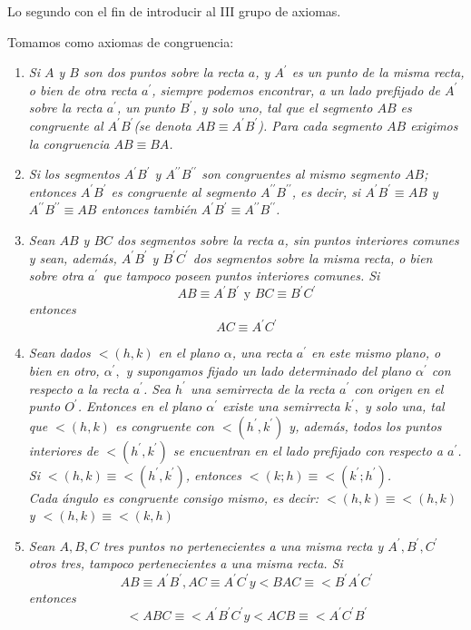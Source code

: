 \documentclass[oneside,spanish]{amsart}
\numberwithin{equation}{section}
\numberwithin{figure}{section}
\theoremstyle{definition}
\begin{document}
Lo segundo con el fin de introducir al III grupo de axiomas.

Tomamos como axiomas de congruencia:
\begin{enumerate}[label=Ax III.\arabic{enumi}]
	\item \emph{Si $A$ y $B$ son dos puntos sobre la recta $a$, y $A^{\prime}$ es un punto de la misma recta, o bien de otra recta $a^{\prime}$, siempre podemos encontrar, a un lado prefijado de $A^{\prime}$ sobre la recta $a^{\prime}$, un punto $B^{\prime}$, y solo uno, tal que el segmento $AB$ es congruente al $A^{\prime}B^{\prime}$(se denota $AB\equiv A^{\prime}B^{\prime}$). Para cada segmento $AB$ exigimos la congruencia $AB\equiv BA$.}
	\item \emph{Si los segmentos $A^{\prime}B^{\prime}$ y $A^{\prime\prime}B^{\prime\prime}$ son congruentes al mismo segmento $AB$; entonces $A^{\prime}B^{\prime}$ es congruente al segmento $A^{\prime\prime}B^{\prime\prime}$, es decir, si $A^{\prime}B^{\prime}\equiv AB$ y $A^{\prime\prime}B^{\prime\prime}\equiv AB$ entonces también $A^{\prime}B^{\prime}\equiv A^{\prime\prime}B^{\prime\prime}$.}
	\item \emph{Sean $AB$ y $BC$ dos segmentos sobre la recta $a$, sin puntos interiores comunes y sean, además, $A^{\prime}B^{\prime}$ y $B^{\prime}C^{\prime}$ dos segmentos sobre la misma recta, o bien sobre otra $a^{\prime}$ que tampoco poseen puntos interiores comunes. Si 
	\[
	AB\equiv A^{\prime}B^{\prime}\text{ y }BC\equiv B^{\prime}C^{\prime}
	\]
	entonces
	\[
	AC\equiv A^{\prime}C^{\prime}
	\]
	}
	\item \emph{Sean dados $<(h,k)$ en el plano $\alpha$, una recta $a^{\prime}$ en este mismo plano, o bien en otro, $\alpha^{\prime},$ y supongamos fijado un lado determinado del plano $\alpha^{\prime}$ con respecto a la recta $a^{\prime}$. Sea $h^{\prime}$ una semirrecta de la recta $a^{\prime}$ con origen en el punto $O^{\prime}$. Entonces en el plano $\alpha^{\prime}$ existe una semirrecta $k^{\prime},$ y solo una, tal que $<(h,k)$ es congruente con $<(h^{\prime},k^{\prime})$ y, además, todos los puntos interiores de $<(h^{\prime},k^{\prime})$ se encuentran en el lado prefijado con respecto a $a^{\prime}$.}\\
	\emph{Si $<(h,k)\equiv<(h^{\prime},k^{\prime})$, entonces $<(k;h)\equiv<(k^{\prime};h^{\prime})$.}\\
	\emph{Cada ángulo es congruente consigo mismo, es decir: $<(h,k)\equiv<(h,k)$ y $<(h,k)\equiv<(k,h)$} \item \emph{Sean $A,B,C$ tres puntos no pertenecientes a una misma recta y $A^{\prime},B^{\prime},C^{\prime}$ otros tres, tampoco pertenecientes a una misma recta. Si
	\[
	AB\equiv A^{\prime}B^{\prime},AC\equiv A^{\prime}C^{\prime}y<BAC\equiv<B^{\prime}A^{\prime}C^{\prime}
	\]
	entonces
	\[
	<ABC\equiv<A^{\prime}B^{\prime}C^{\prime}y<ACB\equiv<A^{\prime}C^{\prime}B^{\prime}
	\]
	}
\end{enumerate}
\end{document}
